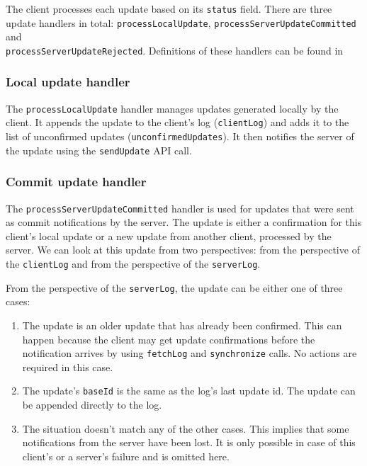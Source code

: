 \documentclass[a4paper, 11pt, oneside]{article}
\theoremstyle{definition}
\begin{document}
The client processes each update based on its \verb|status| field. There are three update handlers in total: \verb|processLocalUpdate|, \verb|processServerUpdateCommitted| and \\ \verb|processServerUpdateRejected|. Definitions of these handlers can be found in 

\subsubsection*{Local update handler}

The \verb|processLocalUpdate| handler manages updates generated locally by the client. It appends the update to the client's log (\verb|clientLog|) and adds it to the list of unconfirmed updates (\verb|unconfirmedUpdates|). It then notifies the server of the update using the \verb|sendUpdate| API call.

\subsubsection*{Commit update handler}

The \verb|processServerUpdateCommitted| handler is used for updates that were sent as commit notifications by the server. The update is either a confirmation for this client's local update or a new update from another client, processed by the server. We can look at this update from two perspectives: from the perspective of the \verb|clientLog| and from the perspective of the \verb|serverLog|.

From the perspective of the \verb|serverLog|, the update can be either one of three cases:

\begin{enumerate}
    \item The update is an older update that has already been confirmed. This can happen because the client may get update confirmations before the notification arrives by using \verb|fetchLog| and \verb|synchronize| calls. No actions are required in this case.
    \item The update's \verb|baseId| is the same as the log's last update id. The update can be appended directly to the log.
    \item The situation doesn't match any of the other cases. This implies that some notifications from the server have been lost. It is only possible in case of this client's or a server's failure and is omitted here.
\end{enumerate}
\end{document}
